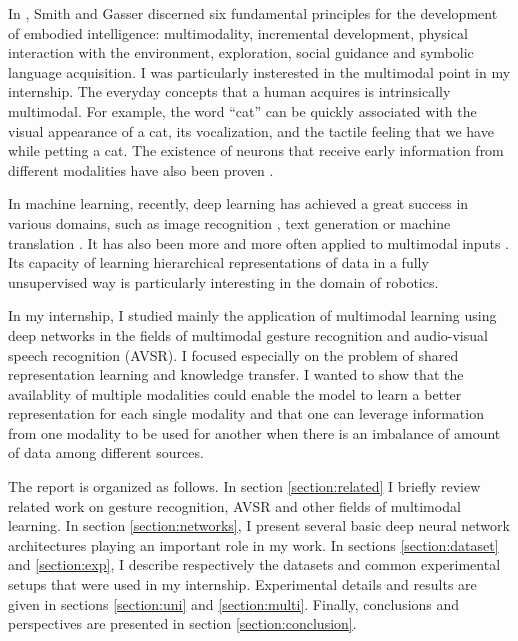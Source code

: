 In \cite{L. Smith 2005}, Smith and Gasser discerned six fundamental
principles for the development of embodied intelligence: multimodality,
incremental development, physical interaction with the environment,
exploration, social guidance and symbolic language acquisition.
I was particularly insterested in the multimodal point in my internship.
The everyday concepts that a human acquires is intrinsically multimodal.
For example, the word ``cat'' can be quickly associated with the visual
appearance of a cat, its vocalization, and the tactile feeling that
we have while petting a cat. The existence of neurons that receive
early information from different modalities have also been proven
\cite{S. Molholm 2002}.

In machine learning, recently, deep learning has achieved a great success in
various domains, such as image recognition \cite{A. Krizhevsky 2012},
text generation \cite{A. Graves 2013} or
machine translation \cite{I. Sutskever 2014}.
It has also been more and more often applied to multimodal inputs
\cite{J. Ngiam 2011, T. Baltrusaitis 2017}.
Its capacity of learning hierarchical representations of data in a
fully unsupervised way \cite{P. Vincent 2010, A. Radford 2015}
is particularly interesting in the domain of robotics.

In my internship, I studied mainly the application of multimodal learning
using deep networks in the fields of multimodal gesture recognition
and audio-visual speech recognition (AVSR).
I focused especially on the problem
of shared representation learning and knowledge transfer. I wanted to show
that the availablity of multiple modalities could enable the model
to learn a better representation for each single modality and that one can
leverage information from one modality to be used for another when there
is an imbalance of amount of data among different sources.

The report is organized as follows. In section \ref{section:related} I
briefly review related work on gesture recognition, AVSR and other
fields of multimodal learning.
In section \ref{section:networks}, I present
several basic deep neural network architectures playing an important
role in my work. In sections \ref{section:dataset} and
\ref{section:exp}, I describe respectively the datasets and common
experimental setups that were used in my internship. Experimental
details and results are given in sections \ref{section:uni} and
\ref{section:multi}. Finally, conclusions and perspectives are
presented in section \ref{section:conclusion}.

